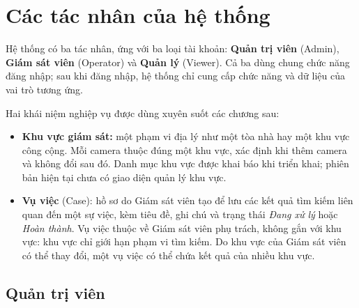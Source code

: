 \section{Các tác nhân của hệ thống}
\label{sec:4.1}

Hệ thống có ba tác nhân, ứng với ba loại tài khoản: \textbf{Quản trị viên} (Admin), \textbf{Giám sát viên} (Operator) và \textbf{Quản lý} (Viewer). Cả ba dùng chung chức năng đăng nhập; sau khi đăng nhập, hệ thống chỉ cung cấp chức năng và dữ liệu của vai trò tương ứng.

Hai khái niệm nghiệp vụ được dùng xuyên suốt các chương sau:
\begin{itemize}
    \item \textbf{Khu vực giám sát:} một phạm vi địa lý như một tòa nhà hay một khu vực công cộng. Mỗi camera thuộc đúng một khu vực, xác định khi thêm camera và không đổi sau đó. Danh mục khu vực được khai báo khi triển khai; phiên bản hiện tại chưa có giao diện quản lý khu vực.
    \item \textbf{Vụ việc} (Case): hồ sơ do Giám sát viên tạo để lưu các kết quả tìm kiếm liên quan đến một sự việc, kèm tiêu đề, ghi chú và trạng thái \emph{Đang xử lý} hoặc \emph{Hoàn thành}. Vụ việc thuộc về Giám sát viên phụ trách, không gắn với khu vực: khu vực chỉ giới hạn phạm vi tìm kiếm. Do khu vực của Giám sát viên có thể thay đổi, một vụ việc có thể chứa kết quả của nhiều khu vực.
\end{itemize}

\subsection{Quản trị viên}
\label{sec:4.1.1}

